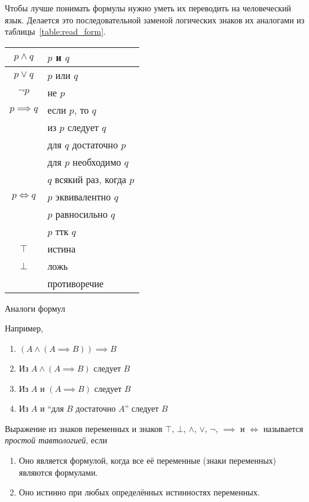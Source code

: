 Чтобы лучше понимать формулы нужно уметь их переводить на человеческий язык. Делается
это последовательной заменой логических знаков
их аналогами из таблицы~\ref{table:read_form}.
\begin{margintable}
	\begin{tabular}{cl}
		$p\land q$    & $p$ и $q$                 \\\hline
		$p\lor q$     & $p$ или $q$               \\\hline
		$\lnot p$     & не $p$                    \\\hline
		$p\implies q$ & если $p$, то $q$          \\
		& из $p$ следует $q$        \\
		& для $q$ достаточно $p$    \\
		& для $p$ необходимо $q$    \\
		& $q$ всякий раз, когда $p$ \\\hline
		$p\iff q$     & $p$ эквивалентно $q$      \\
		& $p$ равносильно $q$       \\
		& $p$ ттк $q$               \\\hline
		$\top$        & истина                    \\\hline
		$\bot$        & ложь                      \\
		& противоречие
	\end{tabular}
	\caption{Аналоги формул}\label{table:read_form}
\end{margintable}

Например,
\begin{enumerate}
	\item{}$(A\land (A\implies B))\implies B$
	\item{}Из $A\land (A\implies B)$ следует $B$
	\item{}Из $A$ и $(A\implies B)$ следует $B$
	\item{}Из $A$ и ``для $B$ достаточно $A$'' следует $B$
\end{enumerate}

\pagebreak

Выражение из знаков переменных и знаков $\top$, $\bot$, $\land$, $\lor$, $\lnot$,
$\implies$ и $\iff$ называется {\it простой тавтологией}, если
\begin{multicols}{2}
	\begin{enumerate}
		\item{}Оно является формулой, когда все её переменные (знаки переменных)
			являются формулами.
			\columnbreak
		\item{}Оно истинно при любых определённых истинностях переменных.
	\end{enumerate}
\end{multicols}

